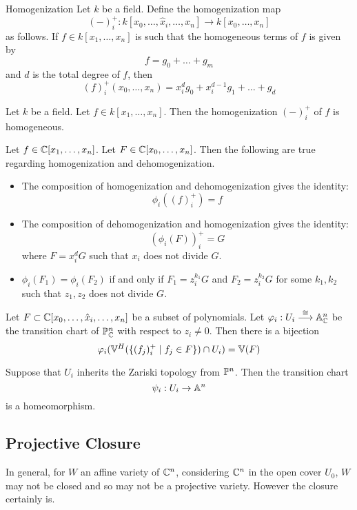 \documentclass[a4paper]{article}
\begin{document}
\begin{defn}{Homogenization}{} Let $k$ be a field. Define the homogenization map $$(-)_i^+:k[x_0,\dots,\hat{x}_i,\dots,x_n]\to k[x_0,\dots,x_n]$$ as follows. If $f\in k[x_1,\dots,x_n]$ is such that the homogeneous terms of $f$ is given by $$f=g_0+\dots+g_m$$ and $d$ is the total degree of $f$, then $$(f)_i^+(x_0,\dots,x_n)=x_i^dg_0+x_i^{d-1}g_1+\dots+g_d$$
\end{defn}

\begin{lmm}{}{} Let $k$ be a field. Let $f\in k[x_1,\dots,x_n]$. Then the homogenization $(-)_i^+$ of $f$ is homogeneous. 
\end{lmm}

\begin{prp}{}{} Let $f\in\mathbb{C}[x_1,\dots,x_n]$. Let $F\in\mathbb{C}[x_0,\dots,x_n]$. Then the following are true regarding homogenization and dehomogenization. 
\begin{itemize}
\item The composition of homogenization and dehomogenization gives the identity: $$\phi_i((f)_i^+)=f$$
\item The composition of dehomogenization and homogenization gives the identity: $$(\phi_i(F))_i^+=G$$ where $F=x_i^dG$ such that $x_i$ does not divide $G$. 
\item $\phi_i(F_1)=\phi_i(F_2)$ if and only if $F_1=z_i^{k_1}G$ and $F_2=z_i^{k_2}G$ for some $k_1,k_2$ such that $z_1,z_2$ does not divide $G$. 
\end{itemize}
\end{prp}

\begin{crl}{}{} Let $F\subset\mathbb{C}[x_0,\dots,\hat{x}_i,\dots,x_n]$ be a subset of polynomials. Let $\varphi_i:U_i\overset{\cong}{\longrightarrow}\mathbb{A}_{\mathbb{C}}^n$ be the transition chart of $\mathbb{P}_{\mathbb{C}}^n$ with respect to $z_i\neq 0$. Then there is a bijection $$\varphi_i(\mathbb{V}^H(\{(f_j)_i^+\;|\;f_j\in F\})\cap U_i)=\mathbb{V}(F)$$
\end{crl}

\begin{crl}{}{} Suppose that $U_i$ inherits the Zariski topology from $\mathbb{P}^n$. Then the transition chart $$\psi_i:U_i\to\mathbb{A}^n$$ is a homeomorphism. 
\end{crl}

\subsection{Projective Closure}
In general, for $W$ an affine variety of $\mathbb{C}^n$, considering $\mathbb{C}^n$ in the open cover $U_0$, $W$ may not be closed and so may not be a projective variety. However the closure certainly is. 
\end{document}
